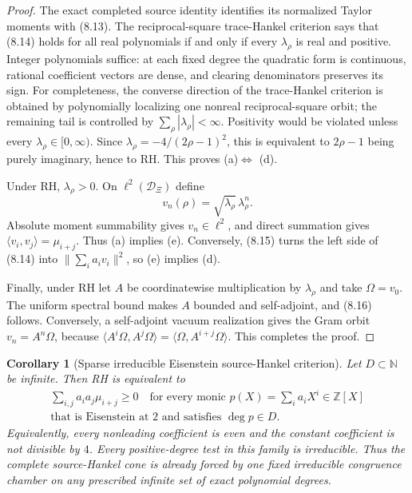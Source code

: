 \documentclass[11pt]{article}
\newtheorem{corollary}[theorem]{Corollary}
\begin{document}
\begin{proof}
The exact completed source identity identifies its normalized Taylor moments with
\textup{(8.13)}.  The reciprocal-square trace-Hankel criterion says that
\textup{(8.14)} holds for all real polynomials if and only if every $\lambda_\rho$ is real and
positive.  Integer polynomials suffice: at each fixed degree the quadratic form is continuous,
rational coefficient vectors are dense, and clearing denominators preserves its sign.  For
completeness, the converse direction of the trace-Hankel criterion is obtained by polynomially
localizing one nonreal reciprocal-square orbit; the remaining tail is controlled by
$\sum_\rho|\lambda_\rho|<\infty$.  Positivity would be violated unless every
$\lambda_\rho\in[0,\infty)$.  Since
$\lambda_\rho=-4/(2\rho-1)^2$, this is equivalent to
$2\rho-1$ being purely imaginary, hence to RH.  This proves \textup{(a)}$\Longleftrightarrow$
\textup{(d)}.

Under RH, $\lambda_\rho>0$.  On
$\ell^2(\mathcal D_\Xi)$ define
\[
 v_n(\rho)=\sqrt{\lambda_\rho}\,\lambda_\rho^n.
 \tag{8.22}
\]
Absolute moment summability gives $v_n\in\ell^2$, and direct summation gives
$\langle v_i,v_j\rangle=\mu_{i+j}$.  Thus \textup{(a)} implies \textup{(e)}.
Conversely, \textup{(8.15)} turns the left side of \textup{(8.14)} into
$\|\sum_i a_iv_i\|^2$, so \textup{(e)} implies \textup{(d)}.

Finally, under RH let $A$ be coordinatewise multiplication by $\lambda_\rho$ and take
$\Omega=v_0$.  The uniform spectral bound makes $A$ bounded and self-adjoint, and
\textup{(8.16)} follows.  Conversely, a self-adjoint vacuum realization gives the Gram orbit
$v_n=A^n\Omega$, because
$\langle A^i\Omega,A^j\Omega\rangle=\langle\Omega,A^{i+j}\Omega\rangle$.
This completes the proof.
\end{proof}

\begin{corollary}[Sparse irreducible Eisenstein source-Hankel criterion]
\label{cor:sparse-eisenstein-hankel}
Let $D\subset\mathbb N$ be infinite.  Then RH is equivalent to
\[
 \begin{gathered}
 \sum_{i,j}a_i a_j\mu_{i+j}\ge0
 \quad\text{for every monic }p(X)=\sum_i a_iX^i\in\mathbb Z[X]\\
 \text{that is Eisenstein at }2\text{ and satisfies }\deg p\in D.
 \end{gathered}
 \tag{8.23}
\]
Equivalently, every nonleading coefficient is even and the constant coefficient is not divisible
by $4$.  Every positive-degree test in this family is irreducible.  Thus the complete
source-Hankel cone is already forced by one fixed irreducible congruence chamber on any prescribed
infinite set of exact polynomial degrees.
\end{corollary}
\end{document}
